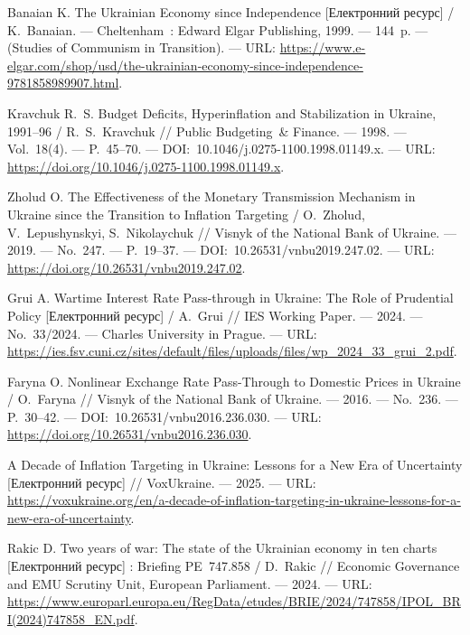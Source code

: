 \documentclass[a4paper,ukrainian,oneside]{extreport}
\begin{document}
\begin{enumerate}[label={[\arabic*]}, leftmargin=0pt, itemindent=0pt, labelindent=0pt]
\item Banaian K. The Ukrainian Economy since Independence [Електронний ресурс] / K.~Banaian. --- Cheltenham~: Edward Elgar Publishing, 1999. --- 144~p. --- (Studies of Communism in Transition). --- URL: \url{https://www.e-elgar.com/shop/usd/the-ukrainian-economy-since-independence-9781858989907.html}.

\item Kravchuk R.~S. Budget Deficits, Hyperinflation and Stabilization in Ukraine, 1991--96 / R.~S.~Kravchuk // Public Budgeting~\& Finance. --- 1998. --- Vol.~18(4). --- P.~45--70. --- DOI:~10.1046/j.0275-1100.1998.01149.x. --- URL: \url{https://doi.org/10.1046/j.0275-1100.1998.01149.x}.

\item Zholud O. The Effectiveness of the Monetary Transmission Mechanism in Ukraine since the Transition to Inflation Targeting / O.~Zholud, V.~Lepushynskyi, S.~Nikolaychuk // Visnyk of the National Bank of Ukraine. --- 2019. --- No.~247. --- P.~19--37. --- DOI:~10.26531/vnbu2019.247.02. --- URL: \url{https://doi.org/10.26531/vnbu2019.247.02}.

\item Grui A. Wartime Interest Rate Pass-through in Ukraine: The Role of Prudential Policy [Електронний ресурс] / A.~Grui // IES Working Paper. --- 2024. --- No.~33/2024. --- Charles University in Prague. --- URL: \url{https://ies.fsv.cuni.cz/sites/default/files/uploads/files/wp_2024_33_grui_2.pdf}.

\item Faryna O. Nonlinear Exchange Rate Pass-Through to Domestic Prices in Ukraine / O.~Faryna // Visnyk of the National Bank of Ukraine. --- 2016. --- No.~236. --- P.~30--42. --- DOI:~10.26531/vnbu2016.236.030. --- URL: \url{https://doi.org/10.26531/vnbu2016.236.030}.

\item A Decade of Inflation Targeting in Ukraine: Lessons for a New Era of Uncertainty [Електронний ресурс] // VoxUkraine. --- 2025. --- URL: \url{https://voxukraine.org/en/a-decade-of-inflation-targeting-in-ukraine-lessons-for-a-new-era-of-uncertainty}.

\item Rakic D. Two years of war: The state of the Ukrainian economy in ten charts [Електронний ресурс] : Briefing PE~747.858 / D.~Rakic // Economic Governance and EMU Scrutiny Unit, European Parliament. --- 2024. --- URL: \url{https://www.europarl.europa.eu/RegData/etudes/BRIE/2024/747858/IPOL_BRI(2024)747858_EN.pdf}.


\end{enumerate}
\end{document}
